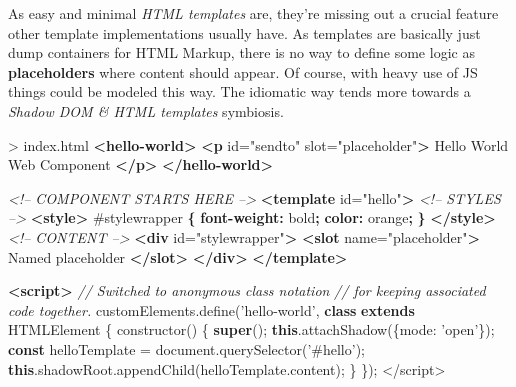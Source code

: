 \documentclass[]{article}
\newenvironment{Shaded}{}{}
\newcommand{\KeywordTok}[1]{\textcolor[rgb]{0.00,0.44,0.13}{\textbf{{#1}}}}
\newcommand{\DataTypeTok}[1]{\textcolor[rgb]{0.56,0.13,0.00}{{#1}}}
\newcommand{\FloatTok}[1]{\textcolor[rgb]{0.25,0.63,0.44}{{#1}}}
\newcommand{\StringTok}[1]{\textcolor[rgb]{0.25,0.44,0.63}{{#1}}}
\newcommand{\SpecialStringTok}[1]{\textcolor[rgb]{0.73,0.40,0.53}{{#1}}}
\newcommand{\CommentTok}[1]{\textcolor[rgb]{0.38,0.63,0.69}{\textit{{#1}}}}
\newcommand{\OtherTok}[1]{\textcolor[rgb]{0.00,0.44,0.13}{{#1}}}
\newcommand{\VariableTok}[1]{\textcolor[rgb]{0.10,0.09,0.49}{{#1}}}
\newcommand{\OperatorTok}[1]{\textcolor[rgb]{0.40,0.40,0.40}{{#1}}}
\newcommand{\AttributeTok}[1]{\textcolor[rgb]{0.49,0.56,0.16}{{#1}}}
\newcommand{\NormalTok}[1]{{#1}}
\begin{document}
As easy and minimal \emph{HTML templates} are, they're missing out a
crucial feature other template implementations usually have. As
templates are basically just dump containers for HTML Markup, there is
no way to define some logic as \textbf{placeholders} where content
should appear. Of course, with heavy use of JS things could be modeled
this way. The idiomatic way tends more towards a \emph{Shadow DOM \&
HTML templates} symbiosis.

\begin{Shaded}
\begin{Highlighting}[]
\NormalTok{> index.html}
\KeywordTok{<hello-world>}
 \KeywordTok{<p}\OtherTok{ id=}\StringTok{"sendto"}\OtherTok{ slot=}\StringTok{"placeholder"}\KeywordTok{>}
  \NormalTok{Hello World Web Component  }
 \KeywordTok{</p>}
\KeywordTok{</hello-world>}

\CommentTok{<!-- COMPONENT STARTS HERE -->}
\KeywordTok{<template}\OtherTok{ id=}\StringTok{"hello"}\KeywordTok{>}
 \CommentTok{<!-- STYLES -->}
 \KeywordTok{<style>}
  \FloatTok{#stylewrapper} \KeywordTok{\{}
   \KeywordTok{font-weight:} \DataTypeTok{bold}\KeywordTok{;}
   \KeywordTok{color:} \NormalTok{orange}\KeywordTok{;}
  \KeywordTok{\}}
 \KeywordTok{</style>}
 \CommentTok{<!-- CONTENT -->}
 \KeywordTok{<div}\OtherTok{ id=}\StringTok{"stylewrapper"}\KeywordTok{>}
  \KeywordTok{<slot}\OtherTok{ name=}\StringTok{"placeholder"}\KeywordTok{>}
   \NormalTok{Named placeholder}
  \KeywordTok{</slot>}
 \KeywordTok{</div>}
\KeywordTok{</template>}

\KeywordTok{<script>}
 \CommentTok{// Switched to anonymous class notation}
 \CommentTok{// for keeping associated code together.}
 \VariableTok{customElements}\NormalTok{.}\AttributeTok{define}\NormalTok{(}\StringTok{'hello-world'}\OperatorTok{,}
  \KeywordTok{class} \KeywordTok{extends} \NormalTok{HTMLElement }\OperatorTok{\{}
   \AttributeTok{constructor}\NormalTok{() }\OperatorTok{\{}
    \KeywordTok{super}\NormalTok{()}\OperatorTok{;}
    \KeywordTok{this}\NormalTok{.}\AttributeTok{attachShadow}\NormalTok{(}\OperatorTok{\{}\DataTypeTok{mode}\OperatorTok{:} \StringTok{'open'}\OperatorTok{\}}\NormalTok{)}\OperatorTok{;}
    \KeywordTok{const} \NormalTok{helloTemplate }\OperatorTok{=} \VariableTok{document}\NormalTok{.}\AttributeTok{querySelector}\NormalTok{(}\StringTok{'#hello'}\NormalTok{)}\OperatorTok{;}
    \KeywordTok{this}\NormalTok{.}\VariableTok{shadowRoot}\NormalTok{.}\AttributeTok{appendChild}\NormalTok{(}\VariableTok{helloTemplate}\NormalTok{.}\AttributeTok{content}\NormalTok{)}\OperatorTok{;}
   \OperatorTok{\}}
  \OperatorTok{\}}\NormalTok{)}\OperatorTok{;}
\OperatorTok{<}\SpecialStringTok{/script>}
\end{Highlighting}
\end{Shaded}
\end{document}
